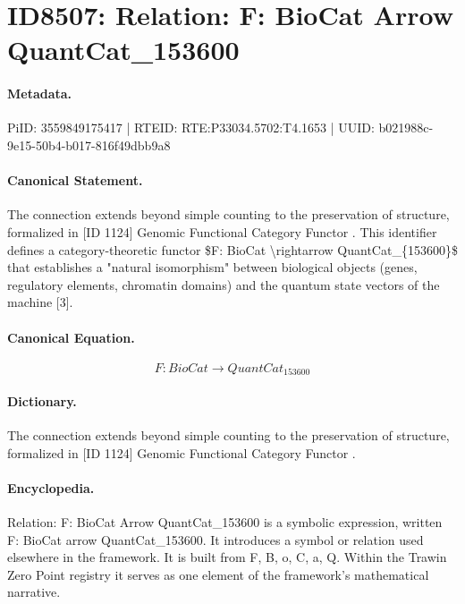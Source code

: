 \section*{ID8507: Relation: F: BioCat Arrow QuantCat\_153600}
\paragraph{Metadata.}
PiID: 3559849175417 | RTEID: RTE:P33034.5702:T4.1653 | UUID: b021988c-9e15-50b4-b017-816f49dbb9a8

\paragraph{Canonical Statement.}
The connection extends beyond simple counting to the preservation of structure, formalized in [ID 1124] Genomic Functional Category Functor . This identifier defines a category-theoretic functor \$F: BioCat \textbackslash{}rightarrow QuantCat\_\{153600\}\$ that establishes a "natural isomorphism" between biological objects (genes, regulatory elements, chromatin domains) and the quantum state vectors of the machine [3].

\paragraph{Canonical Equation.}
\[
F: BioCat \rightarrow QuantCat_{153600}
\]

\paragraph{Dictionary.}
The connection extends beyond simple counting to the preservation of structure, formalized in [ID 1124] Genomic Functional Category Functor .

\paragraph{Encyclopedia.}
Relation: F: BioCat Arrow QuantCat\_153600 is a symbolic expression, written F: BioCat arrow QuantCat\_153600. It introduces a symbol or relation used elsewhere in the framework. It is built from F, B, o, C, a, Q. Within the Trawin Zero Point registry it serves as one element of the framework's mathematical narrative.
